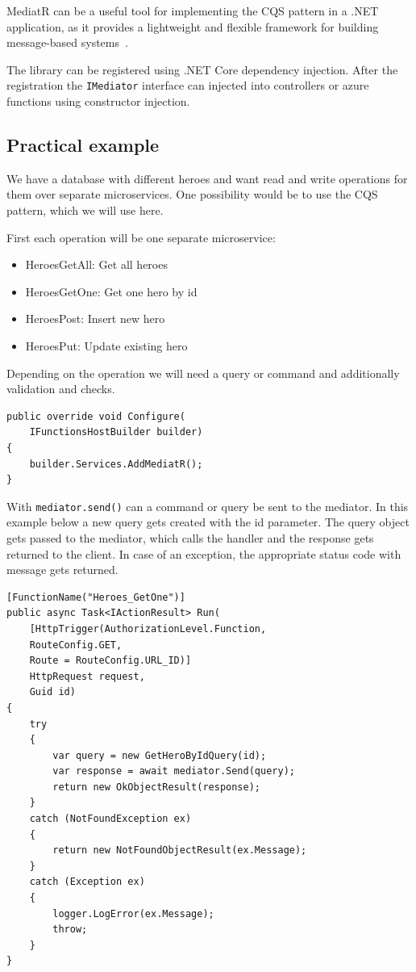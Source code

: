 \documentclass[11pt,conference]{IEEEtran}
\begin{document}
MediatR can be a useful tool for implementing the CQS pattern in a .NET application, as it provides a lightweight and flexible framework for building message-based systems~\cite{mediatr}.

The library can be registered using .NET Core dependency injection.
After the registration the \texttt{IMediator} interface can injected into controllers or azure functions using constructor injection.

\subsection{Practical example}

We have a database with different heroes and want read and write operations for them over separate microservices.
One possibility would be to use the CQS pattern, which we will use here.

First each operation will be one separate microservice:

\begin{itemize}
    \item {HeroesGetAll: Get all heroes}
    \item {HeroesGetOne: Get one hero by id}
    \item {HeroesPost: Insert new hero}
    \item {HeroesPut: Update existing hero}
\end{itemize}

Depending on the operation we will need a query or command and additionally validation and checks.

\begin{lstlisting}[caption=Register MediatR]
public override void Configure(
    IFunctionsHostBuilder builder)
{
    builder.Services.AddMediatR();
}
\end{lstlisting}

With \texttt{mediator.send()} can a command or query be sent to the mediator.
In this example below a new query gets created with the id parameter.
The query object gets passed to the mediator, which calls the handler and the response gets returned to the client.
In case of an exception, the appropriate status code with message gets returned.

\begin{lstlisting}[caption=Azure Function with MediatR]
[FunctionName("Heroes_GetOne")]
public async Task<IActionResult> Run(
    [HttpTrigger(AuthorizationLevel.Function,
    RouteConfig.GET,
    Route = RouteConfig.URL_ID)]
    HttpRequest request,
    Guid id)
{
    try
    {
        var query = new GetHeroByIdQuery(id);
        var response = await mediator.Send(query);
        return new OkObjectResult(response);
    }
    catch (NotFoundException ex)
    {
        return new NotFoundObjectResult(ex.Message);
    }
    catch (Exception ex)
    {
        logger.LogError(ex.Message);
        throw;
    }
}
\end{lstlisting}
\end{document}
